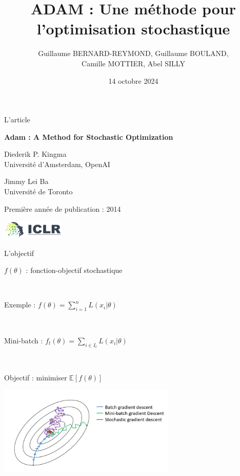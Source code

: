 \documentclass[11pt,aspectratio=169,xcolor=dvipsnames, french]{beamer}
\title{ADAM : Une méthode pour l'optimisation stochastique}
\author{Guillaume BERNARD-REYMOND, Guillaume BOULAND,\\ Camille MOTTIER, Abel SILLY}
\date{14 octobre 2024}
\begin{document}
\frame{\titlepage}

\begin{frame}{L'article}
\begin{center}
 \textbf{Adam : A Method for Stochastic Optimization}

\begin{multicols}{2}

 Diederik P. Kingma\\
 {\small Université d'Amsterdam, OpenAI}
 
 \columnbreak
 
 Jimmy Lei Ba\\
 {\small Université de Toronto}
\end{multicols}

Première année de publication : 2014

\includegraphics[width=3cm]{ICLR_Logo.png}
\end{center}

\end{frame}

\begin{frame}{L'objectif}
	\begin{minipage}[c]{.4\linewidth}
$f(\theta)$ : fonction-objectif stochastique 

\

Exemple : $f(\theta)=\displaystyle\sum_{i=1}^{n}L(x_i|\theta)$ 

\

Mini-batch : $f_t(\theta)=\displaystyle \sum_{i\in I_t}L(x_i|\theta)$

\

Objectif : minimiser $\mathbb E[f(\theta)]$
	\end{minipage} \hfill
	\begin{minipage}[c]{.55\linewidth}
	\includegraphics[width=8.5cm]{batch.png}

	\end{minipage}




\end{frame}
\end{document}
